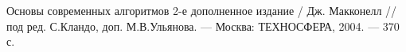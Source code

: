 \documentclass[12pt, a4paper]{article}
\begin{document}
\newpage
\begin{center}
\begin{thebibliography}{}
 Основы современных алгоритмов 2-е дополненное издание / Дж. Макконелл // под ред. С.Кландо, доп. М.В.Ульянова. --- Москва: ТЕХНОСФЕРА, 2004. --- 370 с.
\end{thebibliography}
\end{center}
\end{document}
